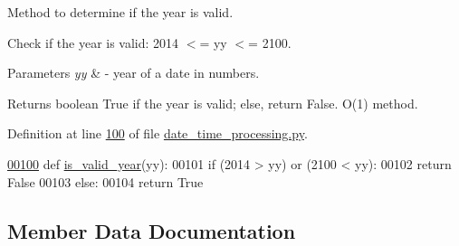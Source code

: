 Method to determine if the year is valid. 

Check if the year is valid\+: 2014 $<$= yy $<$= 2100. 
\begin{DoxyParams}{Parameters}
{\em yy} & -\/ year of a date in numbers. \\
\hline
\end{DoxyParams}
\begin{DoxyReturn}{Returns}
boolean True if the year is valid; else, return False. O(1) method. 
\end{DoxyReturn}


Definition at line \hyperlink{date__time__processing_8py_source_l00100}{100} of file \hyperlink{date__time__processing_8py_source}{date\+\_\+time\+\_\+processing.\+py}.


\begin{DoxyCode}
\hypertarget{classutilities_1_1date__time__processing_1_1date__time__operations_l00100}{}\hyperlink{classutilities_1_1date__time__processing_1_1date__time__operations_a621d736cda0d00786c1e8803cf7fc768}{00100}     \textcolor{keyword}{def }\hyperlink{classutilities_1_1date__time__processing_1_1date__time__operations_a621d736cda0d00786c1e8803cf7fc768}{is\_valid\_year}(yy):
00101         \textcolor{keywordflow}{if} (2014 > yy) \textcolor{keywordflow}{or} (2100 < yy):
00102             \textcolor{keywordflow}{return} \textcolor{keyword}{False}
00103         \textcolor{keywordflow}{else}:
00104             \textcolor{keywordflow}{return} \textcolor{keyword}{True}
\end{DoxyCode}


\subsection{Member Data Documentation}
\hypertarget{classutilities_1_1date__time__processing_1_1date__time__operations_a640d6fe5b1045e4c92057b524264295d}{}
